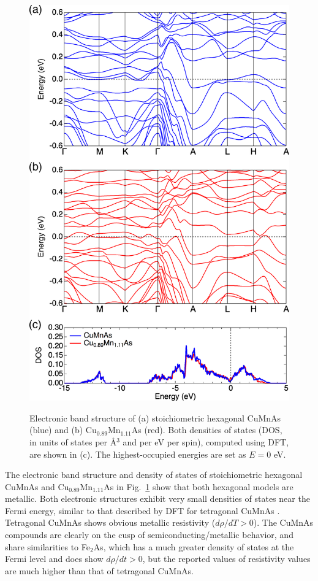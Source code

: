 \documentclass[10pt,doublespacing,edeposit]{uiucthesis2020}
\begin{document}
\begin{mainmatter}
\begin{figure}
\centering\includegraphics[width=0.7\columnwidth]{figures/ch5/h-cumnas-dft-band.png} \\
\caption{\label{fig:DFT-band}
Electronic band structure of (a) stoichiometric hexagonal CuMnAs (blue) and (b) Cu$_{0.89}$Mn$_{1.11}$As (red). Both densities of states (DOS, in units of states per \AA$^3$ and per eV per spin), computed using DFT, are shown in (c).
The highest-occupied energies are set as $E=0$ eV.
}
\end{figure}

The electronic band structure and density of states of stoichiometric hexagonal CuMnAs and Cu$_{0.89}$Mn$_{1.11}$As in Fig.\ \ref{fig:DFT-band} show that both hexagonal models are metallic.
Both electronic structures exhibit very small densities of states near the Fermi energy, similar to that described by DFT for tetragonal CuMnAs \cite{Maca2017}.
Tetragonal CuMnAs shows obvious metallic resistivity ($d\rho/dT > 0$).\cite{Wadley2013}
The CuMnAs compounds are clearly on the cusp of semiconducting/metallic behavior, and share similarities to Fe$_2$As, which has a much greater density of states at the Fermi level and does show $d\rho/dt > 0$, but the reported values of resistivity values are much higher than that of tetragonal CuMnAs.\cite{Yang2019,Takeshita2017}



\end{mainmatter}
\end{document}

